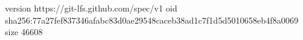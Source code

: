 version https://git-lfs.github.com/spec/v1
oid sha256:77a27fef837346afabc83d0ae29548caceb38ad1c7f1d5d5010658eb4f8a0069
size 46608
